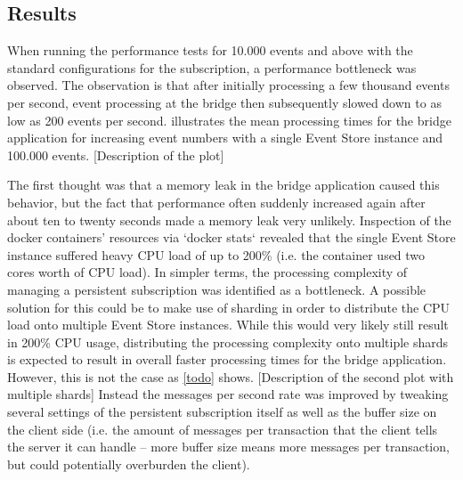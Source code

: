 \subsection{Results}

When running the performance tests for 10.000 events and above with the standard configurations for the subscription, a performance bottleneck was observed.
The observation is that after initially processing a few thousand events per second, event processing at the bridge then subsequently slowed down to as low as 200 events per second.
 illustrates the mean processing times for the bridge application for increasing event numbers with a single Event Store instance and 100.000 events.
[Description of the plot]

The first thought was that a memory leak in the bridge application caused this behavior, but the fact that performance often suddenly increased again after about ten to twenty seconds made a memory leak very unlikely.
Inspection of the docker containers' resources via `docker stats` revealed that the single Event Store instance suffered heavy CPU load of up to 200\% (i.e. the container used two cores worth of CPU load).
In simpler terms, the processing complexity of managing a persistent subscription was identified as a bottleneck.
A possible solution for this could be to make use of sharding in order to distribute the CPU load onto multiple Event Store instances.
While this would very likely still result in 200\% CPU usage, distributing the processing complexity onto multiple shards is expected to result in overall faster processing times for the bridge application.
However, this is not the case as \cref{todo} shows.
[Description of the second plot with multiple shards]
Instead the messages per second rate was improved by tweaking several settings of the persistent subscription itself as well as the buffer size on the client side (i.e. the amount of messages per transaction that the client tells the server it can handle -- more buffer size means more messages per transaction, but could potentially overburden the client).

